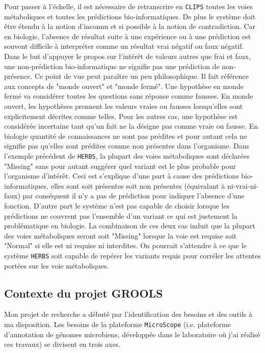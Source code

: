 \begin{refsegment}
Pour passer à l'échelle, il est nécessaire de retranscrire  en \texttt{\gls{CLIPS}}  toutes les voies métaboliques et toutes les prédictions bio-informatiques. De plus le système doit être étendu à la notion d'inconnu et si possible à la notion de contradiction. Car en biologie, l’absence de résultat suite à une expérience ou à une prédiction est souvent difficile à interpréter comme un résultat vrai négatif ou faux négatif.  Dans le but d'appuyer le propos sur l'intérêt de valeurs autres que frai et faux, une non-prédiction bio-informatique ne signifie pas une prédiction de non-présence. Ce point de vue peut paraître un peu philosophique. Il fait référence aux concepts de "monde ouvert" et "monde fermé". Une hypothèse en monde fermé va considérer toutes les questions sans réponse comme fausses. En monde ouvert, les hypothèses prennent les valeurs vraies ou fausses lorsqu'elles sont explicitement décrites comme telles. Pour les autres cas, une hypothèse est considérée incertaine tant qu'un fait ne la désigne pas comme vraie ou fausse. En biologie quantité de connaissances ne sont pas prédites et pour autant cela ne signifie pas qu'elles sont prédites comme non présentes dans l'organisme. Dans l’exemple précédent de \texttt{\gls{HERBS}}, la plupart des voies métaboliques sont déclarées "Missing" sans pour autant suggérer quel variant est le plus probable pour l'organisme d'intérêt. Ceci est s'explique d'une part à cause des prédictions bio-informatiques, elles sont soit présentes soit non présentes (équivalant à ni-vrai-ni-faux) par conséquent il n'y a pas de prédiction pour indiquer l'absence d'une fonction. D'autre part le système n'est pas capable de choisir lorsque les prédictions ne couvrent pas l'ensemble d'un variant ce qui est justement la problématique en biologie. La combinaison de ces deux cas induit que la plupart des voies métaboliques seront soit "Missing" lorsque la voie est requise soit "Normal" si elle est ni requise ni interdites. On pourrait s’attendre à ce que le système \texttt{\gls{HERBS}} soit capable de repérer les variants requis pour corréler les attentes portées sur les voie métaboliques.

\subsection{Contexte du projet GROOLS}

Mon projet de recherche a débuté par l'identification des besoins et des outils à ma disposition. Les besoins de la plateforme \texttt{MicroScope} (i.e. plateforme d’annotation de génomes microbiens, développée dans le laboratoire où j’ai réalisé ces travaux) se divisent en trois axes.


\end{refsegment}
